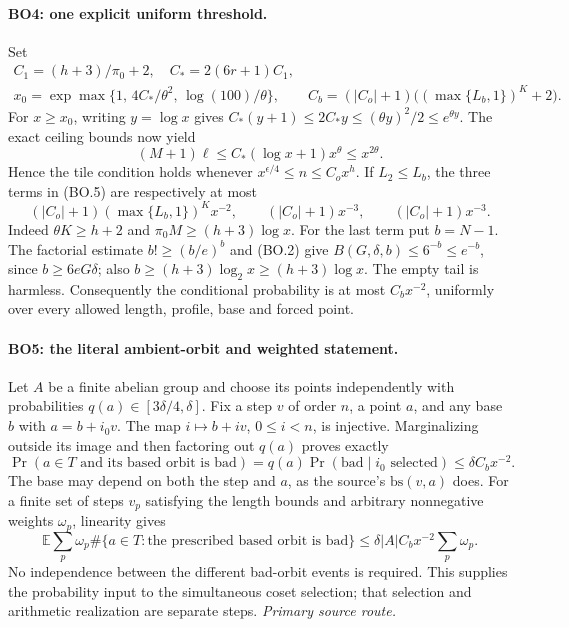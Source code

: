 \documentclass[11pt,a4paper]{article}
\numberwithin{equation}{section}
\theoremstyle{remark}\newtheorem{remark}[theorem]{Remark}
\begin{document}
\paragraph{BO4: one explicit uniform threshold.}
Set
\[
\begin{gathered}
 C_1=(h+3)/\pi_0+2,\quad C_*=2(6r+1)C_1,\\
 x_0=\exp\max\{1,\,4C_*/\theta^2,\,\log(100)/\theta\},\qquad
 C_b=(|C_o|+1)\bigl((\max\{L_b,1\})^K+2\bigr).
\end{gathered}                                                   \tag{BO.6}
\]
For $x\ge x_0$, writing $y=\log x$ gives
$C_*(y+1)\le2C_*y\le(\theta y)^2/2\le e^{\theta y}$.
The exact ceiling bounds now yield
\[
 (M+1)\ell\le C_*(\log x+1)x^\theta
             \le x^{2\theta}.                                  \tag{BO.7}
\]
Hence the tile condition holds whenever
$x^{\epsilon/4}\le n\le C_ox^h$. If $L_2\le L_b$, the three terms
in (BO.5) are respectively at most
\[
 (|C_o|+1)(\max\{L_b,1\})^Kx^{-2},\qquad
 (|C_o|+1)x^{-3},\qquad (|C_o|+1)x^{-3}.                         \tag{BO.8}
\]
Indeed $\theta K\ge h+2$ and $\pi_0M\ge(h+3)\log x$.
For the last term put $b=N-1$. The factorial estimate
$b!\ge(b/e)^b$ and (BO.2) give
$B(G,\delta,b)\le6^{-b}\le e^{-b}$, since $b\ge6eG\delta$;
also $b\ge(h+3)\log_2x\ge(h+3)\log x$. The empty tail is harmless.
Consequently the conditional probability is at most $C_bx^{-2}$,
uniformly over every allowed length, profile, base and forced point.

\paragraph{BO5: the literal ambient-orbit and weighted statement.}
Let $A$ be a finite abelian group and choose its points independently
with probabilities $q(a)\in[3\delta/4,\delta]$. Fix a step $v$ of
order $n$, a point $a$, and any base $b$ with $a=b+i_0v$.
The map $i\mapsto b+iv$, $0\le i<n$, is injective. Marginalizing
outside its image and then factoring out $q(a)$ proves exactly
\[
 \Pr(a\in T\text{ and its based orbit is bad})
 =q(a)\Pr(\mathrm{bad}\mid i_0\text{ selected})
 \le\delta C_bx^{-2}.                                          \tag{BO.9}
\]
The base may depend on both the step and $a$, as the source's
$\mathrm{bs}(v,a)$ does. For a finite set of steps $v_p$ satisfying
the length bounds and arbitrary nonnegative weights $\omega_p$,
linearity gives
\[
 \mathbb E\sum_p\omega_p
   \#\{a\in T:\text{the prescribed based orbit is bad}\}
 \le \delta |A|C_bx^{-2}\sum_p\omega_p.                         \tag{BO.10}
\]
No independence between the different bad-orbit events is required.
This supplies the probability input to the simultaneous coset selection;
that selection and arithmetic realization are separate steps.
\noindent\textit{Primary source route.}\cite{biased-orbit-probability}
\end{document}
